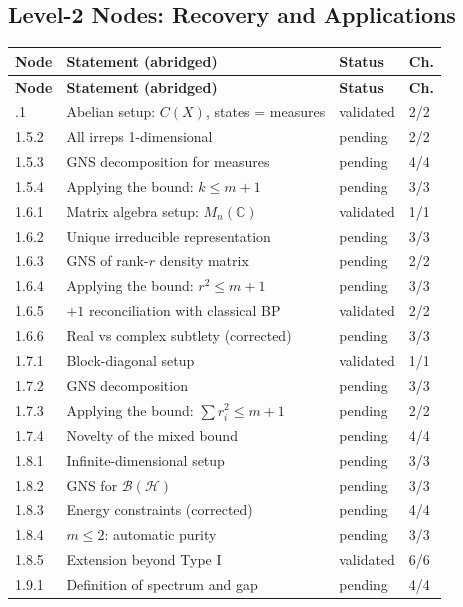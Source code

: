 \documentclass[11pt,a4paper]{article}
\theoremstyle{plain}
\theoremstyle{definition}
\theoremstyle{remark}
\newcommand{\C}{\mathbb{C}}
\newcommand{\Hilbert}{\mathcal{H}}
\newcommand{\BH}{\mathcal{B}(\Hilbert)}
\begin{document}
\subsection{Level-2 Nodes: Recovery and Applications}

\begin{longtable}{lp{6cm}ll}
\toprule
\textbf{Node} & \textbf{Statement (abridged)} & \textbf{Status} & \textbf{Ch.} \\
\midrule
\endfirsthead
\toprule
\textbf{Node} & \textbf{Statement (abridged)} & \textbf{Status} & \textbf{Ch.} \\
\midrule
\endhead
\bottomrule
\endlastfoot
1.5.1 & Abelian setup: $C(X)$, states = measures & validated & 2/2 \\
1.5.2 & All irreps 1-dimensional & pending & 2/2 \\
1.5.3 & GNS decomposition for measures & pending & 4/4 \\
1.5.4 & Applying the bound: $k \le m+1$ & pending & 3/3 \\
\midrule
1.6.1 & Matrix algebra setup: $M_n(\C)$ & validated & 1/1 \\
1.6.2 & Unique irreducible representation & pending & 3/3 \\
1.6.3 & GNS of rank-$r$ density matrix & pending & 2/2 \\
1.6.4 & Applying the bound: $r^2 \le m+1$ & pending & 3/3 \\
1.6.5 & $+1$ reconciliation with classical BP & validated & 2/2 \\
1.6.6 & Real vs complex subtlety (corrected) & pending & 3/3 \\
\midrule
1.7.1 & Block-diagonal setup & validated & 1/1 \\
1.7.2 & GNS decomposition & pending & 3/3 \\
1.7.3 & Applying the bound: $\sum r_i^2 \le m+1$ & pending & 2/2 \\
1.7.4 & Novelty of the mixed bound & pending & 4/4 \\
\midrule
1.8.1 & Infinite-dimensional setup & pending & 3/3 \\
1.8.2 & GNS for $\BH$ & pending & 3/3 \\
1.8.3 & Energy constraints (corrected) & pending & 4/4 \\
1.8.4 & $m \le 2$: automatic purity & pending & 3/3 \\
1.8.5 & Extension beyond Type I & validated & 6/6 \\
\midrule
1.9.1 & Definition of spectrum and gap & pending & 4/4 \\

\end{longtable}
\end{document}
